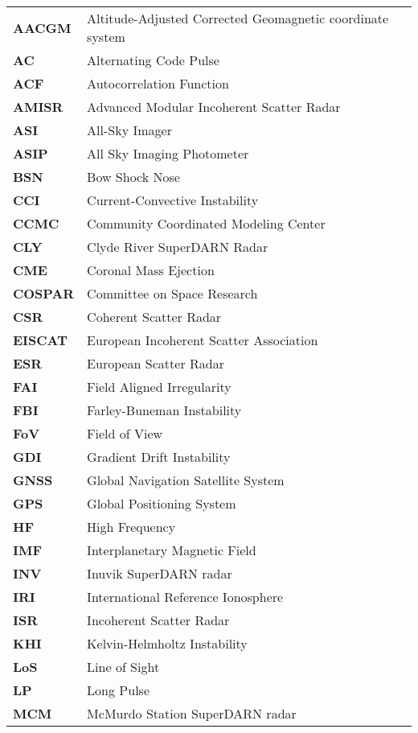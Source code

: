 
\begin{longtable}{ll}
\textbf{AACGM} & Altitude-Adjusted Corrected Geomagnetic coordinate system \\
\textbf{AC} & Alternating Code Pulse \\
\textbf{ACF} & Autocorrelation Function \\
\textbf{AMISR} & Advanced Modular Incoherent Scatter Radar \\
\textbf{ASI} & All-Sky Imager \\
\textbf{ASIP} & All Sky Imaging Photometer \\
\textbf{BSN} & Bow Shock Nose \\
\textbf{CCI} & Current-Convective Instability \\
\textbf{CCMC} & Community Coordinated Modeling Center \\
\textbf{CLY} & Clyde River SuperDARN Radar \\
\textbf{CME} & Coronal Mass Ejection \\
\textbf{COSPAR} & Committee on Space Research \\
\textbf{CSR} & Coherent Scatter Radar \\
\textbf{EISCAT} & European Incoherent Scatter Association \\
\textbf{ESR} & European Scatter Radar \\
\textbf{FAI} & Field Aligned Irregularity \\
\textbf{FBI} & Farley-Buneman Instability \\
\textbf{FoV} & Field of View \\
\textbf{GDI} & Gradient Drift Instability \\
\textbf{GNSS} & Global Navigation Satellite System \\
\textbf{GPS} & Global Positioning System \\
\textbf{HF} & High Frequency \\
\textbf{IMF} & Interplanetary Magnetic Field \\
\textbf{INV} & Inuvik SuperDARN radar \\
\textbf{IRI} & International Reference Ionosphere \\
\textbf{ISR} & Incoherent Scatter Radar \\
\textbf{KHI} & Kelvin-Helmholtz Instability \\
\textbf{LoS} & Line of Sight \\
\textbf{LP} & Long Pulse \\
\textbf{MCM} & McMurdo Station SuperDARN radar \\

\end{longtable}
